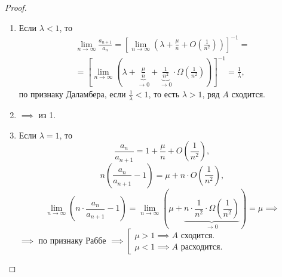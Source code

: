 \begin{proof}\leavevmode
    \begin{enumerate}
        \item Если $\lambda < 1$, то
              \begin{multline*}
                  \underset{n\rightarrow\infty}{\lim} \frac{a_{n+1}}{a_n} = \left[\underset{n\rightarrow\infty}{\lim}\left(\lambda + \frac{\mu}{n} + O\left(\frac{1}{n^2}\right)\right)\right]^{-1} = \\
                  = \left[\underset{n\rightarrow\infty}{\lim}\left(\lambda + \underbrace{\frac{\mu}{n}}_{\rightarrow 0} + \underbrace{\frac{1}{n^2}}_{\rightarrow 0} \cdot \Omega\left(\frac{1}{n^2}\right)\right)\right]^{-1} = \frac{1}{\lambda},
              \end{multline*}
              по признаку Даламбера, если $\frac{1}{\lambda} < 1$, то есть $\lambda > 1$, ряд $A$ сходится.

        \item $ \implies $ из 1.

        \item Если $\lambda = 1$, то
              \[
                  \frac{a_n}{a_{n+1}} = 1 + \frac{\mu}{n} + O\left(\frac{1}{n^2}\right),
              \]
              \[
                  n\left(\frac{a_n}{a_{n+1}} - 1\right) = \mu + n \cdot O\left(\frac{1}{n^2}\right),
              \]
              \[
                  \underset{n\rightarrow\infty}{\lim}\left(n\cdot \frac{a_n}{a_{n+1}} - 1\right) = \underset{n\rightarrow\infty}{\lim}\left(\mu + \underbrace{n \cdot \frac{1}{n^2} \cdot \Omega (\frac{1}{n^2})}_{\rightarrow 0}\right) = \mu \implies
              \]
              $\implies$ по признаку Раббе $\implies \left[\begin{array}{l}
                      \mu > 1 \implies A \text{ сходится.} \\
                      \mu < 1 \implies A \text{ расходится.}
                  \end{array} \right.$


\end{enumerate}
\end{proof}
